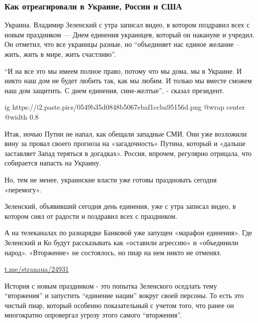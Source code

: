  
 
 
 
 

\subsubsection{Как отреагировали в Украине, России и США}
\label{sec:16_02_2022.stz.news.ua.strana.4.putin_ne_napal.1.reakcia_ukr_rus_usa}

Украина. Владимир Зеленский с утра записал видео, в котором поздравил всех с
новым праздником — Днем единения украинцев, который он накануне и учредил. Он
отметил, что все украинцы разные, но \enquote{объединяет нас единое желание – жить,
жить в мире, жить счастливо}.

\enquote{И на все это мы имеем полное право, потому что мы дома, мы в Украине. И никто
наш дом не будет любить так, как мы любим. И только мы вместе сможем наш дом
защитить. С днем единения, сине-желтые}, - сказал президент.

\ifcmt
  ig https://i2.paste.pics/0549b35d0848b5067ebaf1ccba95156d.png
  @wrap center
  @width 0.8
\fi

Итак, ночью Путин не напал, как обещали западные СМИ. Они уже возложили вину за
провал своего прогноза на «загадочность» Путина, который и «дальше заставляет
Запад теряться в догадках». Россия, впрочем, регулярно отрицала, что собирается
напасть на Украину.

Но, тем не менее, украинские власти уже готовы праздновать сегодня «перемогу».

Зеленский, объявивший сегодня день единения, уже с утра записал видео, в
котором сиял от радости и поздравил всех с праздником.

А на телеканалах по разнарядке Банковой уже запущен «марафон единения». Где
Зеленский и Ко будут рассказывать как «оставили агрессию» и «объединили народ».
«Вторжение» не состоялось, но пиар на нем никто не отменял.

\url{t.me/stranaua/24931}

История с новым праздником - это попытка Зеленского оседлать тему \enquote{вторжения} и
запустить \enquote{единение нации} вокруг своей персоны. То есть это чистый пиар,
который особенно показательный с учетом того, что ранее он многократно
опровергал угрозу этого самого \enquote{вторжения}. 

